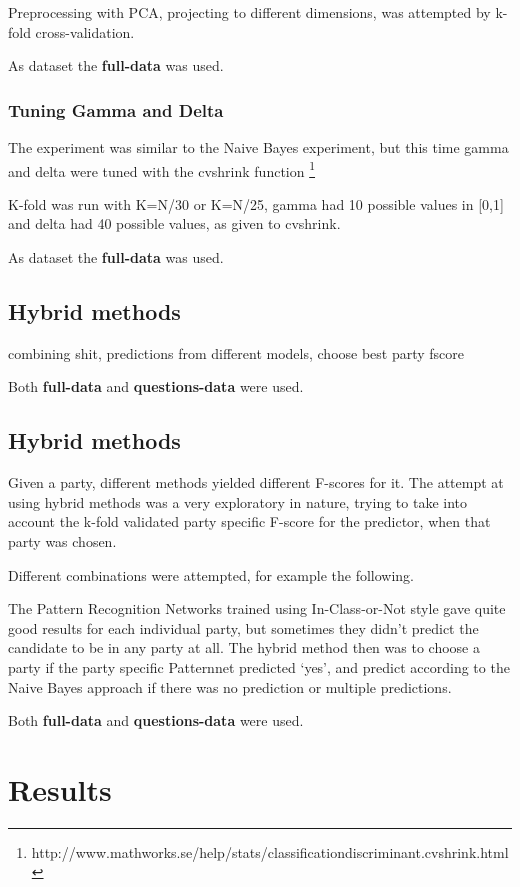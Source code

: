 \documentclass[a4paper,10pt]{article}
\begin{document}
Preprocessing with PCA, projecting to different dimensions, was attempted by k-fold cross-validation.

As dataset the {\bf full-data} was used.

\subsubsection{Tuning Gamma and Delta}

The experiment was similar to the Naive Bayes experiment, but this time gamma and delta were tuned with the cvshrink function
\footnote{http://www.mathworks.se/help/stats/classificationdiscriminant.cvshrink.html}

K-fold was run with K=N/30 or K=N/25, gamma had 10 possible values in [0,1] and delta had 40 possible values, as given to cvshrink.


As dataset the {\bf full-data} was used.

\subsection{Hybrid methods}
combining shit, predictions from different models, choose best party fscore

Both {\bf full-data} and {\bf questions-data} were used.

\subsection{Hybrid methods}
Given a party, different methods yielded different F-scores for it. The attempt at using hybrid methods was a very exploratory in nature, trying to take into account the k-fold validated party specific F-score for the predictor, when that party was chosen.

Different combinations were attempted, for example the following.

The Pattern Recognition Networks trained using In-Class-or-Not style gave quite good results for each individual party, but sometimes they didn’t predict the candidate to be in any party at all. The hybrid method then was to choose a party if the party specific Patternnet predicted ‘yes’, and predict according to the Naive Bayes approach if there was no prediction or multiple predictions.

Both {\bf full-data} and {\bf questions-data} were used.

\section{Results}
\end{document}
